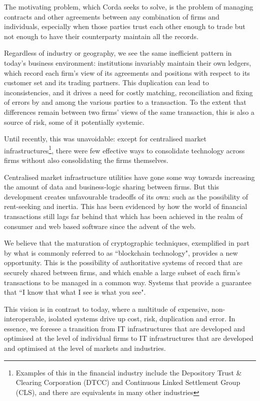 \documentclass{article}
\begin{document}
The motivating problem, which Corda seeks to solve, is the problem of managing contracts and other agreements between any combination of firms and individuals, especially when those parties trust each other enough to trade but not enough to have their counterparty maintain all the records.

Regardless of industry or geography, we see the same inefficient pattern in today's business environment: institutions invariably maintain their own ledgers, which record each firm's view of its agreements and positions with respect to its customer set and its trading partners. This duplication can lead to inconsistencies, and it drives a need for costly matching, reconciliation and fixing of errors by and among the various parties to a transaction. To the extent that differences remain between two firms' views of the same transaction, this is also a source of risk, some of it potentially systemic.

Until recently, this was unavoidable: except for centralised market infrastructures\footnote{Examples of this in the financial industry include the Depository Trust \& Clearing Corporation (DTCC) and Continuous Linked Settlement Group (CLS), and there are equivalents in many other industries}, there were few effective ways to consolidate technology across firms without also consolidating the firms themselves.

Centralised market infrastructure utilities have gone some way towards increasing the amount of data and business-logic sharing between firms. But this development creates unfavourable tradeoffs of its own: such as the possibility of rent-seeking and inertia. This has been evidenced by how the world of financial transactions still lags far behind that which has been achieved in the realm of consumer and web based software since the advent of the web.

We believe that the maturation of cryptographic techniques, exemplified in part by what is commonly referred to as ``blockchain technology", provides a new opportunity. This is the possibility of authoritative systems of record that are securely shared between firms, and which enable a large subset of each firm's transactions to be managed in a common way. Systems that provide a guarantee that ``I know that what I see is what you see".

This vision is in contrast to today, where a multitude of expensive, non-interoperable, isolated systems drive up cost, risk, duplication and error. In essence, we foresee a transition from IT infrastructures that are developed and optimised at the level of individual firms to IT infrastructures that are developed and optimised at the level of markets and industries.
\end{document}
